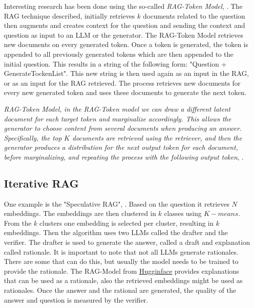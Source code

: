 \documentclass{wseas}
\begin{document}
Interesting research has been done using the so-called \emph{RAG-Token
Model}, \cite{Retrieval_Augmented_Generation_(RAG)_Explained_Understanding_Key_Concepts}. The RAG technique described, initially retrieves \(k\) documents
related to the question then augments and creates context for the question and
sending the context and question as input to an LLM or the
generator. The RAG-Token Model retrieves new documents on every
generated token. Once a token is generated, the token is appended to all
previously generated tokens which are then appended to the initial question. 
This results in a string of the following form: "Question +
GenerateTockenList". This new string is then used again as an input in
the RAG, or as an input for the RAG retrieved. The process retrieves new
documents for every new generated token and uses these documents to
generate the next token. 

\emph{RAG-Token Model, in the RAG-Token model we can draw a different
latent document for each target token and marginalize accordingly. This
allows the generator to choose content from several documents when
producing an answer. Specifically, the top $K$ documents are retrieved using
the retriever, and then the generator produces a distribution for the
next output token for each document, before marginalizing, and repeating
the process with the following output token}, \cite{Retrieval_Augmented_Generation_(RAG)_Explained_Understanding_Key_Concepts}.

\subsection{Iterative RAG}

One example is the "Speculative RAG", \cite{SpeculativeRAG_EnhancingRetrieval-AugmentedGenerationThroughDrafting}. 
Based on the question it retrieves \(N\) embeddings.
The embeddings are then clustered in \(k\) classes using $K-means$. From the
\(k\) clusters one embedding is selected per cluster, resulting in $k$
embeddings. Then the algorithm uses two LLMs called the drafter and the
verifier. The drafter is used to generate the answer, called a draft and
explanation called rationale. It is important to note that not all LLMs
generate rationales. There are some that can do this, but usually the
model needs to be trained to provide the rationale. The RAG-Model from
\href{https://huggingface.co/}{Hugginface} provides explanations that 
can be used as a rationale, also the retrieved embeddings might be used 
as rationales. Once the answer and the rational are generated, the quality 
of the answer and question is measured by the verifier.
\end{document}
